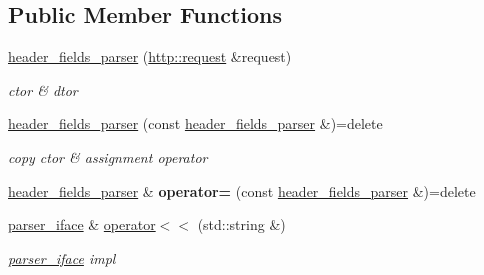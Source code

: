 \subsection*{Public Member Functions}
\begin{DoxyCompactItemize}
\item 
\mbox{\label{classnetflex_1_1parsing_1_1header__fields__parser_a062871b585ec94f1ef3039237debfd4f}} 
\hyperlink{classnetflex_1_1parsing_1_1header__fields__parser_a062871b585ec94f1ef3039237debfd4f}{header\+\_\+fields\+\_\+parser} (\hyperlink{classnetflex_1_1http_1_1request}{http\+::request} \&request)
\begin{DoxyCompactList}\small\item\em ctor \& dtor \end{DoxyCompactList}\item 
\mbox{\label{classnetflex_1_1parsing_1_1header__fields__parser_a09177036c57944df36217a024e64de3f}} 
\hyperlink{classnetflex_1_1parsing_1_1header__fields__parser_a09177036c57944df36217a024e64de3f}{header\+\_\+fields\+\_\+parser} (const \hyperlink{classnetflex_1_1parsing_1_1header__fields__parser}{header\+\_\+fields\+\_\+parser} \&)=delete
\begin{DoxyCompactList}\small\item\em copy ctor \& assignment operator \end{DoxyCompactList}\item 
\mbox{\label{classnetflex_1_1parsing_1_1header__fields__parser_aebe26ebcd6cccc0e010eaa82a2173d91}} 
\hyperlink{classnetflex_1_1parsing_1_1header__fields__parser}{header\+\_\+fields\+\_\+parser} \& {\bfseries operator=} (const \hyperlink{classnetflex_1_1parsing_1_1header__fields__parser}{header\+\_\+fields\+\_\+parser} \&)=delete
\item 
\mbox{\label{classnetflex_1_1parsing_1_1header__fields__parser_a255c485598692bee975e6db49d8ec13c}} 
\hyperlink{classnetflex_1_1parsing_1_1parser__iface}{parser\+\_\+iface} \& \hyperlink{classnetflex_1_1parsing_1_1header__fields__parser_a255c485598692bee975e6db49d8ec13c}{operator$<$$<$} (std\+::string \&)
\begin{DoxyCompactList}\small\item\em \hyperlink{classnetflex_1_1parsing_1_1parser__iface}{parser\+\_\+iface} impl \end{DoxyCompactList}\item 

\end{DoxyCompactItemize}
